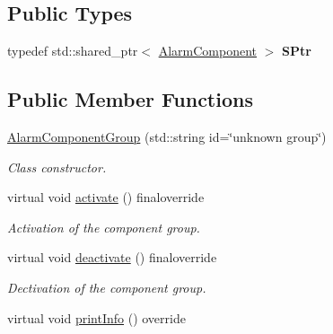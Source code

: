 \subsection*{Public Types}
\begin{DoxyCompactItemize}
\item 
typedef std\+::shared\+\_\+ptr$<$ \hyperlink{classAlarmComponent}{Alarm\+Component} $>$ {\bfseries S\+Ptr}\hypertarget{classAlarmComponentGroup_a007ed91b5a3919ad1b4a76350d3f6774}{}\label{classAlarmComponentGroup_a007ed91b5a3919ad1b4a76350d3f6774}

\end{DoxyCompactItemize}
\subsection*{Public Member Functions}
\begin{DoxyCompactItemize}
\item 
\hyperlink{classAlarmComponentGroup_af999ab1dac77f573df01fb400ec5d044}{Alarm\+Component\+Group} (std\+::string id=\char`\"{}unknown group\char`\"{})
\begin{DoxyCompactList}\small\item\em Class constructor. \end{DoxyCompactList}\item 
virtual void \hyperlink{classAlarmComponentGroup_ac67076993e9068dc15e8d39af29698a4}{activate} () finaloverride
\begin{DoxyCompactList}\small\item\em Activation of the component group. \end{DoxyCompactList}\item 
virtual void \hyperlink{classAlarmComponentGroup_a673cebdc7e32c522af0e7435786ea118}{deactivate} () finaloverride
\begin{DoxyCompactList}\small\item\em Dectivation of the component group. \end{DoxyCompactList}\item 
virtual void \hyperlink{classAlarmComponentGroup_a07b07cb3f5b41360e3aaf83b9d0938b1}{print\+Info} () override\hypertarget{classAlarmComponentGroup_a07b07cb3f5b41360e3aaf83b9d0938b1}{}\label{classAlarmComponentGroup_a07b07cb3f5b41360e3aaf83b9d0938b1}


\end{DoxyCompactItemize}
